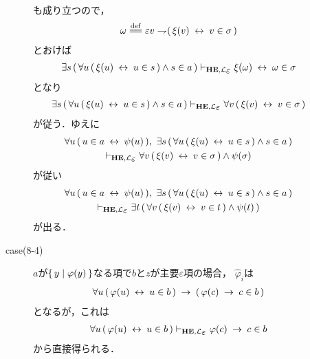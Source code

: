 \begin{metaprf}
\begin{description}
\begin{description}
\begin{align}
						\end{align}
						も成り立つので，
						\begin{align}
							\omega \defeq \varepsilon v \negation (\, \xi(v) \lrarrow v \in \sigma\, )
						\end{align}
						とおけば
						\begin{align}
							\exists s\, (\, \forall u\, (\, \xi(u) \lrarrow u \in s\, ) \wedge s \in a\, ) 
							\provable{\mbox{{\bf HE}},\lang{\varepsilon}} \xi(\omega) \lrarrow \omega \in \sigma
						\end{align}
						となり
						\begin{align}
							\exists s\, (\, \forall u\, (\, \xi(u) \lrarrow u \in s\, ) \wedge s \in a\, ) 
							\provable{\mbox{{\bf HE}},\lang{\varepsilon}} \forall v\, (\, \xi(v) \lrarrow v \in \sigma\, )
						\end{align}
						が従う．ゆえに
						\begin{align}
							\begin{gathered}
								\forall u\, (\, u \in a \lrarrow \psi(u)\, ),\ 
								\exists s\, (\, \forall u\, (\, \xi(u) \lrarrow u \in s\, ) \wedge s \in a\, ) \\
								\provable{\mbox{{\bf HE}},\lang{\varepsilon}} \forall v\, (\, \xi(v) \lrarrow v \in \sigma\, ) \wedge \psi(\sigma)
							\end{gathered}
						\end{align}
						が従い
						\begin{align}
							\begin{gathered}
								\forall u\, (\, u \in a \lrarrow \psi(u)\, ),\ 
								\exists s\, (\, \forall u\, (\, \xi(u) \lrarrow u \in s\, ) \wedge s \in a\, ) \\
								\provable{\mbox{{\bf HE}},\lang{\varepsilon}} \exists t\, (\, \forall v\, (\, \xi(v) \lrarrow v \in t\, ) \wedge \psi(t)\, )
							\end{gathered}
						\end{align}
						が出る．
						
					\item[case(8-4)] $a$が$\{\, y \mid \varphi(y)\, \}$なる項で$b$と$z$が主要$\varepsilon$項の場合，
						$\widehat{\varphi}_{i}$は
						\begin{align}
							\forall u\, (\, \varphi(u) \hspace{0.25em}\leftrightarrow\hspace{0.25em} u \in b\, ) 
							\hspace{0.25em}\rightarrow\hspace{0.25em} (\, \varphi(c) \hspace{0.25em}\rightarrow\hspace{0.25em} c \in b\, )
						\end{align}
						となるが，これは
						\begin{align}
							\forall u\, (\, \varphi(u) \lrarrow u \in b\, ) 
							\provable{\mbox{{\bf HE}},\lang{\varepsilon}} 
							\varphi(c) \rarrow c \in b
						\end{align}
						から直接得られる．
						

\end{description}
\end{description}
\end{metaprf}
